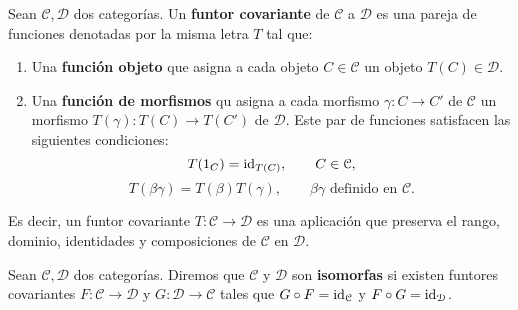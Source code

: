 \begin{definicion}
	Sean \(\mathcal{C}, \mathcal{D}\) dos categorías. Un \textbf{funtor covariante} de
	\(\mathcal{C}\) a \(\mathcal{D}\) es una pareja de funciones denotadas por
		la misma letra \(T\) tal que:
	\begin{enumerate}
		\item Una \textbf{función objeto} que asigna a cada objeto
		\(C \in \mathcal{C}\) un objeto \(T(C) \in \mathcal{D}\).
		
		\item Una \textbf{función de morfismos} qu asigna a cada morfismo
		\(\gamma: C \rightarrow C'\) de \(\mathcal{C}\) un morfismo
		\(T(\gamma): T(C) \rightarrow T(C')\) de \(\mathcal{D}\). Este par de funciones
		satisfacen las siguientes condiciones:
		\begin{equation}
			T(1_{C}) = \operatorname{id}_{T(C)}, \qquad C \in \mathcal{C},
		\end{equation}
		\begin{equation}
			T(\beta \gamma) = T(\beta)T(\gamma), \qquad \beta \gamma \text{ definido
				en }\mathcal{C}.
		\end{equation}
	\end{enumerate}
\end{definicion}

Es decir, un funtor covariante \(T: \mathcal{C}\rightarrow \mathcal{D}\) es una
aplicación que preserva el rango, dominio, identidades y composiciones de
\(\mathcal{C}\) en \(\mathcal{D}\).

\begin{definicion}
	Sean \(\mathcal{C}, \mathcal{D}\) dos categorías. Diremos que \(\mathcal{C}\) y \(\mathcal{D}\) son \textbf{isomorfas} si existen funtores covariantes $F: \mathcal{C} \to \mathcal{D}$ y $G: \mathcal{D} \to \mathcal{C}$ tales que $G \circ F = \operatorname{id}_\mathcal{C}$ y  $F \circ G = \operatorname{id}_\mathcal{D}$.
\end{definicion}

%
